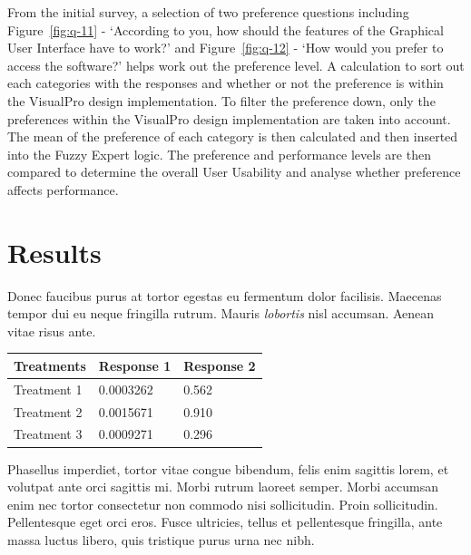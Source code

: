 \documentclass[a0,portrait]{a0poster}
\begin{document}
\begin{multicols}{2}
From the initial survey, a selection of two preference questions including Figure~\ref{fig:q-11} - `According to you, how should the features of the Graphical User Interface have to work?' and Figure~\ref{fig:q-12} - `How would you prefer to access the software?' helps work out the preference level. A calculation to sort out each categories with the responses and whether or not the preference is within the VisualPro design implementation. To filter the preference down, only the preferences within the VisualPro design implementation are taken into account. The mean of the preference of each category is then calculated and then inserted into the Fuzzy Expert logic. The preference and performance levels are then compared to determine the overall User Usability and analyse whether preference affects performance.

\section*{Results}

Donec faucibus purus at tortor egestas eu fermentum dolor facilisis. Maecenas tempor dui eu neque fringilla rutrum. Mauris \emph{lobortis} nisl accumsan. Aenean vitae risus ante.
%
\begin{table} %
\begin{tabular}{l l l}
\toprule
\textbf{Treatments} & \textbf{Response 1} & \textbf{Response 2}\\
\midrule
Treatment 1 & 0.0003262 & 0.562 \\
Treatment 2 & 0.0015671 & 0.910 \\
Treatment 3 & 0.0009271 & 0.296 \\
\bottomrule
\end{tabular}
\end{table}
%
Phasellus imperdiet, tortor vitae congue bibendum, felis enim sagittis lorem, et volutpat ante orci sagittis mi. Morbi rutrum laoreet semper. Morbi accumsan enim nec tortor consectetur non commodo nisi sollicitudin. Proin sollicitudin. Pellentesque eget orci eros. Fusce ultricies, tellus et pellentesque fringilla, ante massa luctus libero, quis tristique purus urna nec nibh.


\end{multicols}
\end{document}
